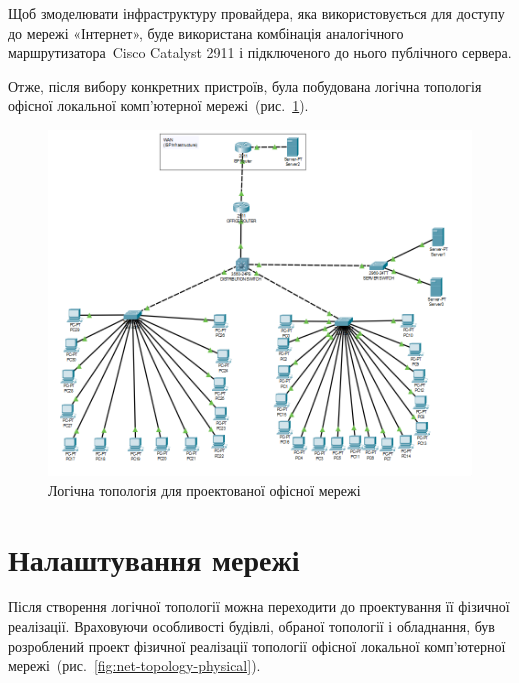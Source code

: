 \documentclass[
  ukrainian,
  simple,
  floatsection,
]{eskdnaukvd}
\begin{document}
      Щоб змоделювати інфраструктуру провайдера, яка використовується для доступу до мережі «Інтернет», буде використана комбінація аналогічного маршрутизатора~\textenglish{Cisco Catalyst 2911} і підключеного до нього публічного сервера.

      Отже, після вибору конкретних пристроїв, була побудована логічна топологія офісної локальної комп'ютерної мережі~(рис.~\ref{fig:net-topology-logical}).

      \begin{figure}[!htbp]
        \centering
        \includegraphics[width = \columnwidth]{./assets/05-net-topology-logical.png}
        \caption{Логічна топологія для проектованої офісної мережі}
        \label{fig:net-topology-logical}
      \end{figure}

  \section{Налаштування мережі}
    Після створення логічної топології можна переходити до проектування її фізичної реалізації. Враховуючи особливості будівлі, обраної топології і обладнання, був розроблений проект фізичної реалізації топології офісної локальної комп'ютерної мережі~(рис.~\ref{fig:net-topology-physical}).
\end{document}
